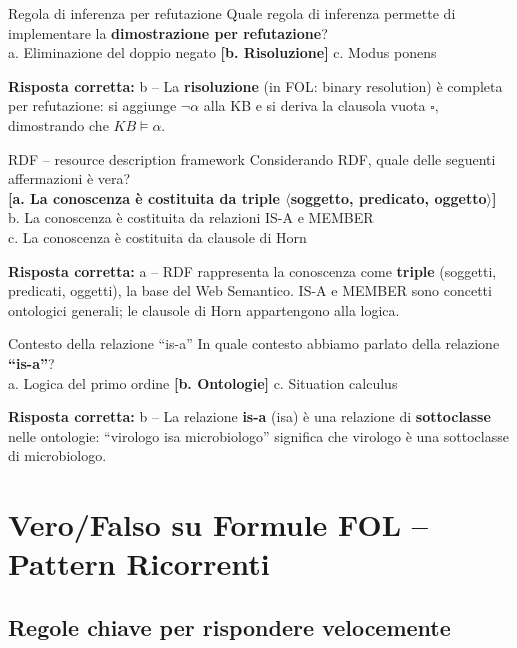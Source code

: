 \documentclass[12pt,a4paper]{article}
\newcommand{\corr}[1]{\textcolor{green!55!black}{\textbf{[#1]}}}
\newcommand{\risp}[1]{\begin{abox}\textbf{Risposta corretta: }#1\end{abox}}
\begin{document}
\bigskip
\begin{qbox}{Regola di inferenza per refutazione}
Quale regola di inferenza permette di implementare la \textbf{dimostrazione per refutazione}?
\\[4pt]
a. Eliminazione del doppio negato \quad \corr{b. Risoluzione} \quad c. Modus ponens
\end{qbox}
\risp{b -- La \textbf{risoluzione} (in FOL: binary resolution) è completa per refutazione: si aggiunge $\neg\alpha$ alla KB e si deriva la clausola vuota $\square$, dimostrando che $KB \models \alpha$.}

\bigskip
\begin{qbox}{RDF -- resource description framework}
Considerando RDF, quale delle seguenti affermazioni è vera?
\\[4pt]
\corr{a. La conoscenza è costituita da triple $\langle$soggetto, predicato, oggetto$\rangle$}\\
b. La conoscenza è costituita da relazioni IS-A e MEMBER\\
c. La conoscenza è costituita da clausole di Horn
\end{qbox}
\risp{a -- RDF rappresenta la conoscenza come \textbf{triple} (soggetti, predicati, oggetti), la base del Web Semantico. IS-A e MEMBER sono concetti ontologici generali; le clausole di Horn appartengono alla logica.}

\bigskip
\begin{qbox}{Contesto della relazione ``is-a''}
In quale contesto abbiamo parlato della relazione \textbf{``is-a''}?
\\[4pt]
a. Logica del primo ordine \quad \corr{b. Ontologie} \quad c. Situation calculus
\end{qbox}
\risp{b -- La relazione \textbf{is-a} (isa) è una relazione di \textbf{sottoclasse} nelle ontologie: ``virologo isa microbiologo'' significa che virologo è una sottoclasse di microbiologo.}

\section{Vero/Falso su Formule FOL -- Pattern Ricorrenti}

\subsection*{Regole chiave per rispondere velocemente}
\end{document}
